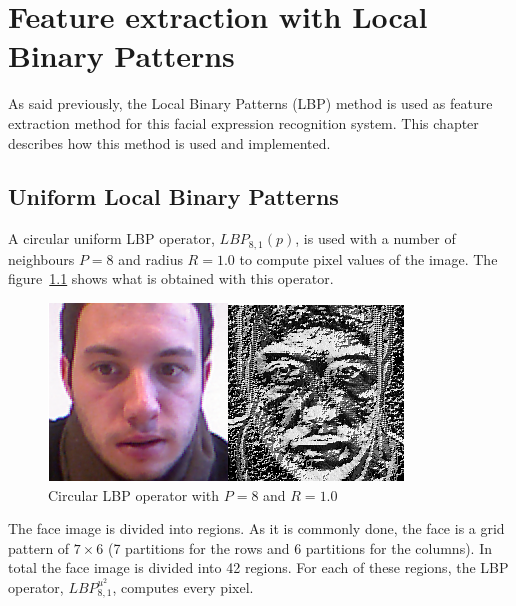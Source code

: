 \chapter{Feature extraction with Local Binary Patterns}
\label{chap:implementation_lbp}

\noindent As said previously, the Local Binary Patterns (LBP) method is used as feature extraction method for this facial expression recognition system. This chapter describes how this method is used and implemented.
\newline

\section{Uniform Local Binary Patterns}

\vspace{\baselineskip}
\noindent A circular uniform LBP operator, $ LBP_{8,1}(p) $, is used with a number of neighbours $ P = 8 $ and radius $ R = 1.0 $ to compute pixel values of the image. The figure~\ref{lbp_implementation_example} shows what is obtained with this operator. 
\newline

\begin{figure}[!h]
\begin{center}
\noindent \includegraphics[scale=0.8]{figures/lbp_implementation_example} 
\newline
\caption{Circular LBP operator with $ P = 8 $ and $ R = 1.0 $}
\label{lbp_implementation_example}
\end{center} 
\end{figure}

\noindent The face image is divided into regions. As it is commonly done, the face is a grid pattern of $ 7\times6 $ (7 partitions for the rows and 6 partitions for the columns). In total the face image is divided into 42 regions. For each of these regions, the LBP operator, $ LBP_{8,1}^{u^2} $, computes every pixel.
\newline

